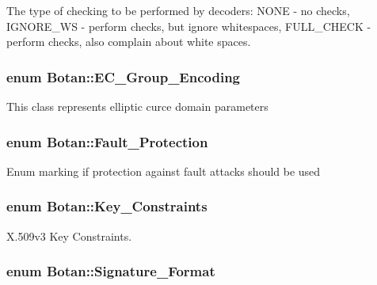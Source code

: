 The type of checking to be performed by decoders\-: N\-O\-N\-E -\/ no checks, I\-G\-N\-O\-R\-E\-\_\-\-W\-S -\/ perform checks, but ignore whitespaces, F\-U\-L\-L\-\_\-\-C\-H\-E\-C\-K -\/ perform checks, also complain about white spaces. \hypertarget{namespaceBotan_ad0ee6307c8f311388a2bc00426a7f858}{
\subsubsection[{E\-C\-\_\-\-Group\-\_\-\-Encoding}]{\setlength{\rightskip}{0pt plus 5cm}enum {\bf Botan\-::\-E\-C\-\_\-\-Group\-\_\-\-Encoding}}}\label{namespaceBotan_ad0ee6307c8f311388a2bc00426a7f858}
This class represents elliptic curce domain parameters \hypertarget{namespaceBotan_aae2b282dc87e72b73f8c55ba01d88b24}{
\subsubsection[{Fault\-\_\-\-Protection}]{\setlength{\rightskip}{0pt plus 5cm}enum {\bf Botan\-::\-Fault\-\_\-\-Protection}}}\label{namespaceBotan_aae2b282dc87e72b73f8c55ba01d88b24}
Enum marking if protection against fault attacks should be used \hypertarget{namespaceBotan_aed0885e5c70627dd43827b966e727654}{
\subsubsection[{Key\-\_\-\-Constraints}]{\setlength{\rightskip}{0pt plus 5cm}enum {\bf Botan\-::\-Key\-\_\-\-Constraints}}}\label{namespaceBotan_aed0885e5c70627dd43827b966e727654}
X.\-509v3 Key Constraints. \hypertarget{namespaceBotan_ad8a9578625edf847cbcba3ae15648cda}{
\subsubsection[{Signature\-\_\-\-Format}]{\setlength{\rightskip}{0pt plus 5cm}enum {\bf Botan\-::\-Signature\-\_\-\-Format}}}\label{namespaceBotan_ad8a9578625edf847cbcba3ae15648cda}
